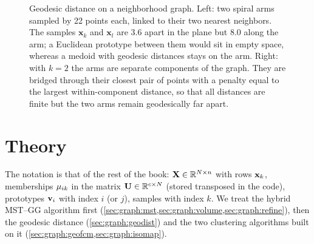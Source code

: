 \begin{figure}[htbp]
\caption[Geodesic distance on a neighborhood graph.]{Geodesic distance on a neighborhood graph. Left: two spiral arms sampled by 22 points each, linked to their two nearest neighbors. The samples $\mathbf{x}_k$ and $\mathbf{x}_l$ are 3.6 apart in the plane but 8.0 along the arm; a Euclidean prototype between them would sit in empty space, whereas a medoid with geodesic distances stays on the arm. Right: with $k=2$ the arms are separate components of the graph. They are bridged through their closest pair of points with a penalty equal to the largest within-component distance, so that all distances are finite but the two arms remain geodesically far apart.}
\label{fig:graph:geodesic}
\end{figure}

\section{Theory}\label{sec:graph:theory}

The notation is that of the rest of the book: $\mathbf{X}\in\mathbb{R}^{N\times n}$ with rows $\mathbf{x}_k$, memberships $\mu_{ik}$ in the matrix $\mathbf{U}\in\mathbb{R}^{c\times N}$ (stored transposed in the code), prototypes $\mathbf{v}_i$ with index $i$ (or $j$), samples with index $k$. We treat the hybrid MST--GG algorithm first (\cref{sec:graph:mst,sec:graph:volume,sec:graph:refine}), then the geodesic distance (\cref{sec:graph:geodist}) and the two clustering algorithms built on it (\cref{sec:graph:geofcm,sec:graph:isomap}).

